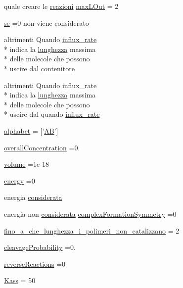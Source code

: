 \begin{DoxyCompactItemize}
quale creare le \hyperlink{a00113_a69962f56e60d0c88abc5d4b6839c2886}{reazioni} \hyperlink{a00113_abb126c97fed10420e64f85923bf5e04b}{max\+L\+Out} = 2
\item 
\hyperlink{a00113_a99032f27eaf45da350b544c68aa6467c}{se} =0 non viene considerato
\item 
altrimenti Quando \hyperlink{a00113_ad795c71664f3161dc8f7a769341daadf}{influx\+\_\+rate} \\*
indica la \hyperlink{a00106_a984d293145d85a936f430c0990316e51}{lunghezza} massima \\*
delle molecole che possono \\*
uscire dal \hyperlink{a00113_a8fcf98921930aa3720acdd081c5b0c2f}{contenitore}
\item 
altrimenti Quando influx\+\_\+rate \\*
indica la \hyperlink{a00106_a984d293145d85a936f430c0990316e51}{lunghezza} massima \\*
delle molecole che possono \\*
uscire dal quando \hyperlink{a00113_ad795c71664f3161dc8f7a769341daadf}{influx\+\_\+rate}
\item 
\hyperlink{a00113_abcbc32fc68e4323620d6171a17310212}{alphabet} = \mbox{[}'\hyperlink{a00111_abfef5bcdab19147dbfbb68112da17044}{A\+B}'\mbox{]}
\item 
\hyperlink{a00113_a59597688ed79473c0234f45eb9167574}{overall\+Concentration} =0.
\item 
\hyperlink{a00113_a9bc498ccac8db41438f855f5dd3f4c05}{volume} =1e-\/18
\item 
\hyperlink{a00113_ac002779c383d2cc783e881f94449de66}{energy} =0
\item 
energia \hyperlink{a00113_ad76697f83c5d8bf201c45822af227e21}{considerata}
\item 
energia non \hyperlink{a00113_ad76697f83c5d8bf201c45822af227e21}{considerata} \hyperlink{a00113_ac5d9cfec5453da5efc3e8d574b455833}{complex\+Formation\+Symmetry} =0
\item 
\hyperlink{a00113_ab6966d9ee620bc7376dc41a38352b948}{fino\+\_\+a\+\_\+che\+\_\+lunghezza\+\_\+i\+\_\+polimeri\+\_\+non\+\_\+catalizzano} = 2
\item 
\hyperlink{a00113_a9d512df05ee559766d2b8f08e4704b04}{cleavage\+Probability} =0.
\item 
\hyperlink{a00113_a650532b3a3c04865cc35cff6d567c5c0}{reverse\+Reactions} =0
\item 
\hyperlink{a00113_a484afe97369bc993daaa71613dd2a665}{Kass} = 50
\item 

\end{DoxyCompactItemize}
